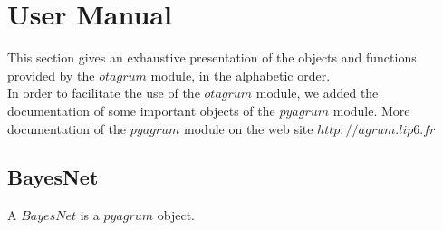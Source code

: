 



\section{User Manual}

This section gives an exhaustive presentation of the objects and functions provided by the $otagrum$ module, in the alphabetic order. \\
In order to facilitate the use of the $otagrum$ module, we added the documentation of some important objects of the $pyagrum$ module. More  documentation of the $pyagrum$ module on the web site $http://agrum.lip6.fr$



\subsection{BayesNet}

A  $BayesNet$ is a $pyagrum$ object. 

